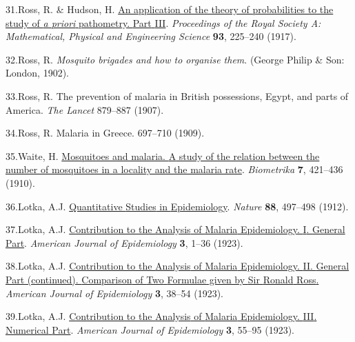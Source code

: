 \documentclass[
]{book}
\newlength{\cslhangindent}
\newlength{\cslentryspacingunit} %
\newenvironment{CSLReferences}[2] %
 {%
  \setlength{\parindent}{0pt}
  \ifodd #1
  \let\oldpar\par
  \def\par{\hangindent=\cslhangindent\oldpar}
  \fi
  \setlength{\parskip}{#2\cslentryspacingunit}
 }%
 {}
\begin{document}
\begin{CSLReferences}{0}{0}
\leavevmode{}%
31.Ross, R. \& Hudson, H. \href{http://adsabs.harvard.edu/abs/1917RSPSA..93..225R}{An application of the theory of probabilities to the study of \emph{a priori} pathometry. {Part} {III}}. \emph{Proceedings of the Royal Society A: Mathematical, Physical and Engineering Science} \textbf{93}, 225--240 (1917).

\leavevmode{}%
32.Ross, R. \emph{Mosquito brigades and how to organise them}. (George Philip \& Son: London, 1902).

\leavevmode{}%
33.Ross, R. The prevention of malaria in {British} possessions, {Egypt}, and parts of {America}. \emph{The Lancet} 879--887 (1907).

\leavevmode{}%
34.Ross, R. Malaria in {Greece}. 697--710 (1909).

\leavevmode{}%
35.Waite, H. \href{https://doi.org/10.2307/2345376}{Mosquitoes and malaria. {A} study of the relation between the number of mosquitoes in a locality and the malaria rate}. \emph{Biometrika} \textbf{7}, 421--436 (1910).

\leavevmode{}%
36.Lotka, A.J. \href{https://doi.org/10.1038/088497b0}{Quantitative {Studies} in {Epidemiology}}. \emph{Nature} \textbf{88}, 497--498 (1912).

\leavevmode{}%
37.Lotka, A.J. \href{https://doi.org/10.1093/oxfordjournals.aje.a118963}{Contribution to the {Analysis} of {Malaria} {Epidemiology}. {I}. {General} {Part}}. \emph{American Journal of Epidemiology} \textbf{3}, 1--36 (1923).

\leavevmode{}%
38.Lotka, A.J. \href{https://doi.org/10.1093/oxfordjournals.aje.a118965}{Contribution to the {Analysis} of {Malaria} {Epidemiology}. {II}. {General} {Part} (continued). {Comparison} of {Two} {Formulae} given by {Sir} {Ronald} {Ross}.} \emph{American Journal of Epidemiology} \textbf{3}, 38--54 (1923).

\leavevmode{}%
39.Lotka, A.J. \href{https://doi.org/10.1093/oxfordjournals.aje.a118966}{Contribution to the {Analysis} of {Malaria} {Epidemiology}. {III}. {Numerical} {Part}}. \emph{American Journal of Epidemiology} \textbf{3}, 55--95 (1923).


\end{CSLReferences}
\end{document}
